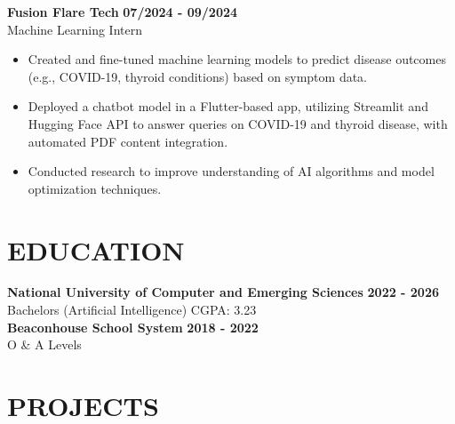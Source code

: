 \documentclass[a4paper,10pt]{article}
\begin{document}
\textbf{ Fusion Flare Tech } \hfill \textbf{ 07/2024 - 09/2024 } \\
Machine Learning Intern \hfill \\[-0.3em]
\begin{itemize}[leftmargin=1em, noitemsep, topsep=0pt, partopsep=0pt, parsep=0pt]

    \item Created and fine-tuned machine learning models to predict disease outcomes (e.g., COVID-19, thyroid conditions) based on symptom data.

    \item Deployed a chatbot model in a Flutter-based app, utilizing Streamlit and Hugging Face API to answer queries on COVID-19 and thyroid disease, with automated PDF content integration.

    \item Conducted research to improve understanding of AI algorithms and model optimization techniques.

\end{itemize}\vspace{0.3em} %


\section*{EDUCATION}

\textbf{ National University of Computer and Emerging Sciences } \hfill \textbf{ 2022 - 2026 } \\
Bachelors (Artificial Intelligence) \hfill CGPA: 3.23\\[0.3em] %

\textbf{ Beaconhouse School System } \hfill \textbf{ 2018 - 2022 } \\
O \& A Levels\\[0.3em] %


\section*{PROJECTS}
\end{document}
